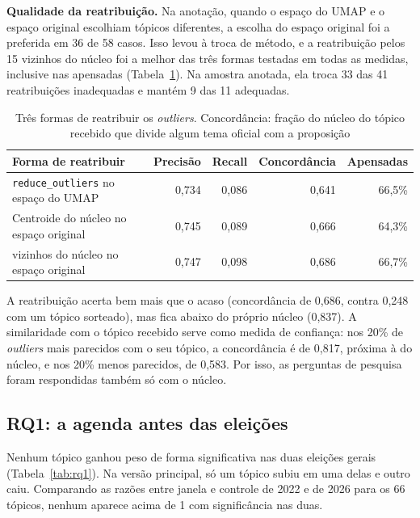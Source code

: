 \textbf{Qualidade da reatribuição.} Na anotação, quando o espaço do UMAP e o espaço original escolhiam tópicos diferentes, a escolha do espaço original foi a preferida em 36 de 58 casos. Isso levou à troca de método, e a reatribuição pelos 15 vizinhos do núcleo foi a melhor das três formas testadas em todas as medidas, inclusive nas apensadas (Tabela~\ref{tab:reatrib}). Na amostra anotada, ela troca 33 das 41 reatribuições inadequadas e mantém 9 das 11 adequadas.

\begin{table}[H]
\centering
\caption{Três formas de reatribuir os \textit{outliers}. Concordância: fração do núcleo do tópico recebido que divide algum tema oficial com a proposição}
\label{tab:reatrib}
\small
\begin{tabularx}{\textwidth}{>{\raggedright\arraybackslash}X r r r r}
\toprule
\textbf{Forma de reatribuir} & \textbf{Precisão} & \textbf{Recall} & \textbf{Concordância} & \textbf{Apensadas} \\
\midrule
\texttt{reduce\_outliers} no espaço do UMAP & 0,734 & 0,086 & 0,641 & 66,5\% \\
Centroide do núcleo no espaço original & 0,745 & 0,089 & 0,666 & 64,3\% \\
15 vizinhos do núcleo no espaço original & 0,747 & 0,098 & 0,686 & 66,7\% \\
\bottomrule
\end{tabularx}
\end{table}

A reatribuição acerta bem mais que o acaso (concordância de 0,686, contra 0,248 com um tópico sorteado), mas fica abaixo do próprio núcleo (0,837). A similaridade com o tópico recebido serve como medida de confiança: nos 20\% de \textit{outliers} mais parecidos com o seu tópico, a concordância é de 0,817, próxima à do núcleo, e nos 20\% menos parecidos, de 0,583. Por isso, as perguntas de pesquisa foram respondidas também só com o núcleo.

\subsection{RQ1: a agenda antes das eleições}
\label{subsec:res-rq1}

Nenhum tópico ganhou peso de forma significativa nas duas eleições gerais (Tabela~\ref{tab:rq1}). Na versão principal, só um tópico subiu em uma delas e outro caiu. Comparando as razões entre janela e controle de 2022 e de 2026 para os 66 tópicos, nenhum aparece acima de 1 com significância nas duas.

